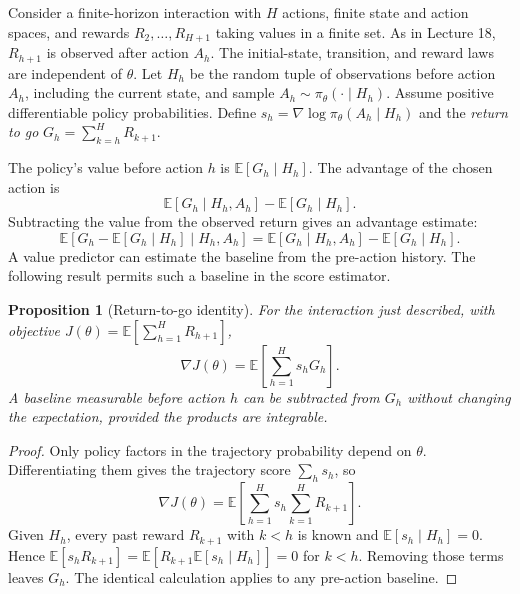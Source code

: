 \documentclass[11pt,twoside]{article}
\newcommand{\E}{\mathbb E}
\newtheorem{proposition}[theorem]{Proposition}
\theoremstyle{definition}
\theoremstyle{remark}
\begin{document}
Consider a finite-horizon interaction with $H$ actions, finite state and
action spaces, and rewards $R_2,\ldots,R_{H+1}$ taking values in a finite set.
As in Lecture 18, $R_{h+1}$ is observed after action $A_h$. The initial-state,
transition, and reward laws are independent of $\theta$.
Let $H_h$ be the random tuple of observations before action $A_h$,
including the current state, and sample
$A_h\sim\pi_\theta(\cdot\mid H_h)$.
Assume positive differentiable policy probabilities. Define
$s_h=\nabla\log\pi_\theta(A_h\mid H_h)$ and the
\emph{return to go} $G_h=\sum_{k=h}^H R_{k+1}$.

The policy's value before action $h$ is $\E[G_h\mid H_h]$.
The advantage of the chosen action is
\[
 \E[G_h\mid H_h,A_h]-\E[G_h\mid H_h].
\]
Subtracting the value from the observed return gives an advantage estimate:
\[
 \E[G_h-\E[G_h\mid H_h]\mid H_h,A_h]
 =\E[G_h\mid H_h,A_h]-\E[G_h\mid H_h].
\]
A value predictor can estimate the baseline from the pre-action history.
The following result permits such a baseline in the score estimator.

\begin{proposition}[Return-to-go identity]
\label{prop:return}
For the interaction just described, with objective
$J(\theta)=\E[\sum_{h=1}^H R_{h+1}]$,
\[
 \nabla J(\theta)=\E\!\left[\sum_{h=1}^H s_hG_h\right].
\]
A baseline measurable before action $h$ can be subtracted from $G_h$
without changing the expectation, provided the products are integrable.
\end{proposition}
\begin{proof}
Only policy factors in the trajectory probability depend on $\theta$.
Differentiating them gives the trajectory score $\sum_h s_h$, so
\[
 \nabla J(\theta)=\E\!\left[
 \sum_{h=1}^H s_h\sum_{k=1}^H R_{k+1}\right].
\]
Given $H_h$, every past reward $R_{k+1}$ with $k<h$ is known and
$\E[s_h\mid H_h]=0$. Hence
$\E[s_hR_{k+1}]=\E[R_{k+1}\E[s_h\mid H_h]]=0$ for $k<h$.
Removing those terms leaves $G_h$. The identical calculation applies to
any pre-action baseline.
\end{proof}
\end{document}
